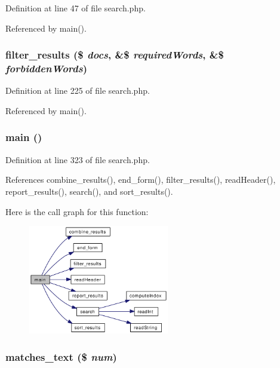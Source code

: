 Definition at line 47 of file search.php.

Referenced by main().\hypertarget{search_8php_a3ad63db949fe271191c2bce3be45b1b}{
\subsubsection[filter\_\-results]{\setlength{\rightskip}{0pt plus 5cm}filter\_\-results (\$ {\em docs}, \&\$ {\em required\-Words}, \&\$ {\em forbidden\-Words})}}
\label{search_8php_a3ad63db949fe271191c2bce3be45b1b}




Definition at line 225 of file search.php.

Referenced by main().\hypertarget{search_8php_51af30a60f9f02777c6396b8247e356f}{
\subsubsection[main]{\setlength{\rightskip}{0pt plus 5cm}main ()}}
\label{search_8php_51af30a60f9f02777c6396b8247e356f}




Definition at line 323 of file search.php.

References combine\_\-results(), end\_\-form(), filter\_\-results(), read\-Header(), report\_\-results(), search(), and sort\_\-results().

Here is the call graph for this function:\begin{figure}[H]
\begin{center}
\leavevmode
\includegraphics[width=174pt]{search_8php_51af30a60f9f02777c6396b8247e356f_cgraph}
\end{center}
\end{figure}
\hypertarget{search_8php_8e29983d33c26f48eaa33c9fc1fea1f6}{
\subsubsection[matches\_\-text]{\setlength{\rightskip}{0pt plus 5cm}matches\_\-text (\$ {\em num})}}
\label{search_8php_8e29983d33c26f48eaa33c9fc1fea1f6}




